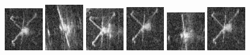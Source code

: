 \begin{figure}
    \includegraphics[width=0.15\textwidth]{chapters/images/dataset/all-class-images/valve/valve-116.jpg}
    \includegraphics[width=0.15\textwidth]{chapters/images/dataset/all-class-images/valve/valve-28.jpg}
    \includegraphics[width=0.15\textwidth]{chapters/images/dataset/all-class-images/valve/valve-72.jpg}
    \includegraphics[width=0.15\textwidth]{chapters/images/dataset/all-class-images/valve/valve-147.jpg}
    \includegraphics[width=0.15\textwidth]{chapters/images/dataset/all-class-images/valve/valve-6.jpg}
    \includegraphics[width=0.15\textwidth]{chapters/images/dataset/all-class-images/valve/valve-145.jpg}
    

\end{figure}
